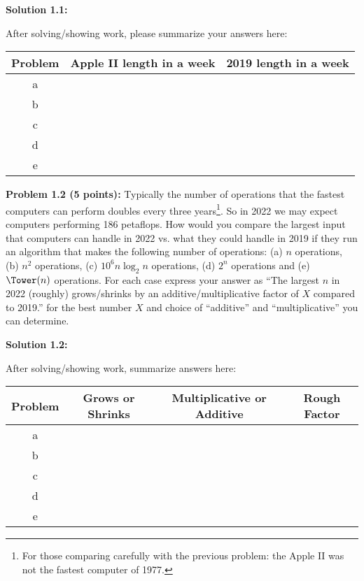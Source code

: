 \documentclass[11pt]{article}
\begin{document}
\textbf{Solution 1.1:} %

After solving/showing work, please summarize your answers here:

\begin{center}
\begin{tabular}{ |c|c|c| }
 \hline
 Problem & Apple II length in a week & 2019 length in a week \\
 \hline
 a &  &  \\
 \hline
 b &  &  \\
 \hline
 c &  &  \\
 \hline
 d &  &  \\
 \hline
 e &  &  \\
 \hline
\end{tabular}
\end{center}

\textbf{Problem 1.2 (5 points):}
Typically the number of operations that the fastest computers can perform doubles every three years\footnote{For those comparing carefully with the previous problem: the Apple II was not the fastest computer of 1977.}.  So in 2022 we may expect computers performing 186 petaflops. How would you compare the largest input that computers can handle in 2022 vs. what they could handle in 2019 if they run an algorithm that makes the following number of operations:
(a) $n$ operations, (b) $n^2$ operations, (c) $10^6 n \log_2 n$ operations, (d) $2^n$ operations and (e) $\Tower(n)$ operations. For each case express your answer as ``The largest $n$ in 2022 (roughly) grows/shrinks by an additive/multiplicative factor of $X$ compared to 2019.'' for the best number $X$ and choice of ``additive'' and ``multiplicative'' you can determine.

\textbf{Solution 1.2:} %

After solving/showing work, summarize answers here:

\begin{center}
\begin{tabular}{ |c|c|c|c| }
 \hline
 Problem & Grows or Shrinks & Multiplicative or Additive & Rough Factor \\
 \hline
 a &  &  & \\
 \hline
 b &  &  & \\
 \hline
 c &  &  & \\
 \hline
 d &  &  & \\
 \hline
 e &  &  & \\
 \hline
\end{tabular}
\end{center}
\end{document}
